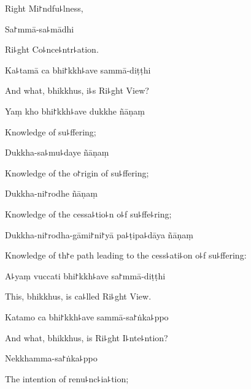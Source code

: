 \begin{english}
  Right Mi꜓ndfu꜕lness,
\end{english}

Sa꜓mmā-sa꜕mādhi

\begin{english}
  Ri꜕ght Co꜕nce꜕ntr꜕ation.
\end{english}

Ka꜕tamā ca bhi꜓kkh꜕ave sammā-diṭṭhi

\begin{english}
  And what, bhikkhus, i꜕s Ri꜕ght View?
\end{english}

Yaṃ kho bhi꜓kkh꜕ave dukkhe ñāṇaṃ

\begin{english}
  Knowledge of su꜕ffering;
\end{english}

Dukkha-sa꜕mu꜕daye ñāṇaṃ

\begin{english}
  Knowledge of the o꜓rigin of su꜕ffering;
\end{english}

Dukkha-ni꜓rodhe ñāṇaṃ

\begin{english}
  Knowledge of the cessa꜕tio꜕n o꜕f su꜕ffe꜕ring;
\end{english}

Dukkha-ni꜓rodha-gāmi꜓ni꜓yā pa꜕ṭipa꜕dāya ñāṇaṃ

\begin{english}
  Knowledge of th꜓e path leading to the cess꜕ati꜕on o꜕f su꜕ffering:
\end{english}

A꜕yaṃ vuccati bhi꜓kkh꜕ave sa꜓mmā-diṭṭhi

\begin{english}
  This, bhikkhus, is ca꜕lled Ri꜕ght View.
\end{english}

Katamo ca bhi꜓kkh꜕ave sammā-sa꜓ṅka꜕ppo

\begin{english}
  And what, bhikkhus, is Ri꜕ght I꜕nte꜕ntion?
\end{english}

\ifaivedition
\clearpage
\fi

Nekkhamma-sa꜓ṅka꜕ppo

\begin{english}
  The intention of renu꜕nc꜕ia꜕tion;
\end{english}

